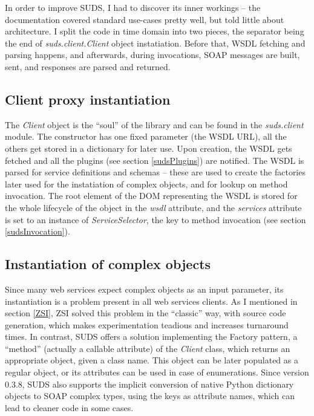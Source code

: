 In order to improve SUDS, I had to discover its inner workings -- the documentation covered standard use-cases pretty well, but told little about architecture. I split the code in time domain into two pieces, the separator being the end of \emph{suds.client.Client} object instatiation. Before that, WSDL fetching and parsing happens, and afterwards, during invocations, SOAP messages are built, sent, and responses are parsed and returned.

\subsection{Client proxy instantiation}

The \emph{Client} object is the ``soul'' of the library and can be found in the \emph{suds.client} module. The constructor has one fixed parameter (the WSDL URL), all the others get stored in a dictionary for later use. Upon creation, the WSDL gets fetched and all the plugins (see section \ref{sudsPlugins}) are notified. The WSDL is parsed for service definitions and schemas -- these are used to create the factories later used for the instatiation of complex objects, and for lookup on method invocation. The root element of the DOM representing the WSDL is stored for the whole lifecycle of the object in the \emph{wsdl} attribute, and the \emph{services} attribute is set to an instance of \emph{ServiceSelector}, the key to method invocation (see section \ref{sudsInvocation}).

\subsection{Instantiation of complex objects}

Since many web services expect complex objects as an input parameter, its instantiation is a problem present in all web services clients. As I mentioned in section \ref{ZSI}, ZSI solved this problem in the ``classic'' way, with source code generation, which makes experimentation teadious and increases turnaround times. In contrast, SUDS offers a solution implementing the Factory pattern, a ``method'' (actually a callable attribute) of the \emph{Client} class, which returns an appropriate object, given a class name. This object can be later populated as a regular object, or its attributes can be used in case of enumerations. Since version 0.3.8, SUDS also supports the implicit conversion of native Python dictionary objects to SOAP complex types, using the keys as attribute names, which can lead to cleaner code in some cases.

